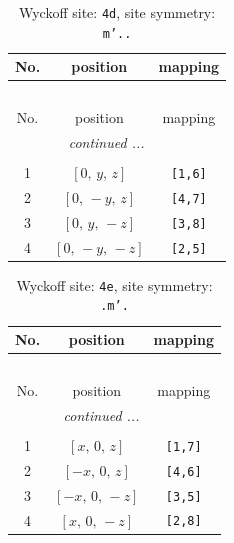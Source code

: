 \documentclass[fleqn,8pt]{jsarticle}
\begin{document}
\begin{longtable}{ccc}
\caption{Wyckoff site: {\tt 4d}, site symmetry: {\tt m'..}}
 \\
 \hline \hline
No. & position & mapping \\ \hline \endfirsthead

\multicolumn{2}{l}{\tablename\ \thetable{}} \\
 \hline \hline
No. & position & mapping \\ \hline \endhead

 \hline \hline
\multicolumn{2}{r}{\footnotesize\it continued ...} \\ \endfoot

 \hline \hline
\multicolumn{2}{r}{} \\ \endlastfoot

1 & $\left[ 0,\, y,\, z \right]$ & {\tt [1,6]} \\ \hline
2 & $\left[ 0,\, - y,\, z \right]$ & {\tt [4,7]} \\ \hline
3 & $\left[ 0,\, y,\, - z \right]$ & {\tt [3,8]} \\ \hline
4 & $\left[ 0,\, - y,\, - z \right]$ & {\tt [2,5]} \\
\end{longtable}
\renewcommand{\arraystretch}{1.2}
\begin{longtable}{ccc}
\caption{Wyckoff site: {\tt 4e}, site symmetry: {\tt .m'.}}
 \\
 \hline \hline
No. & position & mapping \\ \hline \endfirsthead

\multicolumn{2}{l}{\tablename\ \thetable{}} \\
 \hline \hline
No. & position & mapping \\ \hline \endhead

 \hline \hline
\multicolumn{2}{r}{\footnotesize\it continued ...} \\ \endfoot

 \hline \hline
\multicolumn{2}{r}{} \\ \endlastfoot

1 & $\left[ x,\, 0,\, z \right]$ & {\tt [1,7]} \\ \hline
2 & $\left[ - x,\, 0,\, z \right]$ & {\tt [4,6]} \\ \hline
3 & $\left[ - x,\, 0,\, - z \right]$ & {\tt [3,5]} \\ \hline
4 & $\left[ x,\, 0,\, - z \right]$ & {\tt [2,8]} \\
\end{longtable}
\renewcommand{\arraystretch}{1.2}
\end{document}

